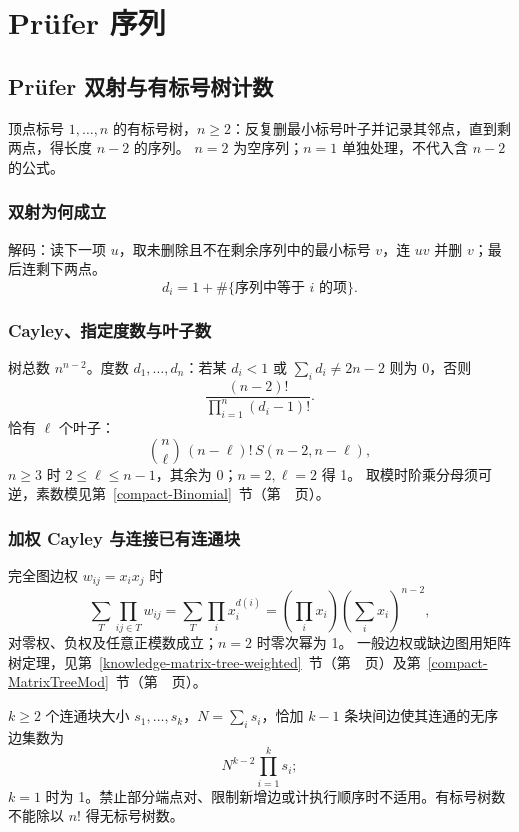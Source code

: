 \Needspace{180pt}

\chapter{Prüfer 序列}

\section{Prüfer 双射与有标号树计数}\label{knowledge-prufer}
顶点标号 $1,\ldots,n$ 的有标号树，$n\ge2$：反复删最小标号叶子并记录其邻点，直到剩两点，得长度 $n-2$ 的序列。
$n=2$ 为空序列；$n=1$ 单独处理，不代入含 $n-2$ 的公式。

\subsection{双射为何成立}
解码：读下一项 $u$，取未删除且不在剩余序列中的最小标号 $v$，连 $uv$ 并删 $v$；最后连剩下两点。
\[
 d_i=1+\#\{\text{序列中等于 }i\text{ 的项}\}.
\]

\subsection{Cayley、指定度数与叶子数}
树总数 $n^{n-2}$。度数 $d_1,\ldots,d_n$：若某 $d_i<1$ 或 $\sum_id_i\ne2n-2$ 则为 0，否则
\[
 \frac{(n-2)!}{\prod_{i=1}^n(d_i-1)!}.
\]
恰有 $\ell$ 个叶子：
\[
 \binom n\ell\,(n-\ell)!\,S(n-2,n-\ell),
\]
$n\ge3$ 时 $2\le\ell\le n-1$，其余为 0；$n=2,\ell=2$ 得 1。
取模时阶乘分母须可逆，素数模见第~\ref{compact-Binomial}~节（第~\pageref{compact-Binomial}~页）。

\clearpage
\subsection{加权 Cayley 与连接已有连通块}
完全图边权 $w_{ij}=x_ix_j$ 时
\[
 \sum_T\prod_{ij\in T}w_{ij}
 =\sum_T\prod_i x_i^{d(i)}
 =\left(\prod_i x_i\right)\left(\sum_i x_i\right)^{n-2},
\]
对零权、负权及任意正模数成立；$n=2$ 时零次幂为 1。
一般边权或缺边图用矩阵树定理，见第~\ref{knowledge-matrix-tree-weighted}~节（第~\pageref{knowledge-matrix-tree-weighted}~页）及第~\ref{compact-MatrixTreeMod}~节（第~\pageref{compact-MatrixTreeMod}~页）。

$k\ge2$ 个连通块大小 $s_1,\ldots,s_k$，$N=\sum_is_i$，恰加 $k-1$ 条块间边使其连通的无序边集数为
\[
 N^{k-2}\prod_{i=1}^k s_i;
\]
$k=1$ 时为 1。禁止部分端点对、限制新增边或计执行顺序时不适用。有标号树数不能除以 $n!$ 得无标号树数。



